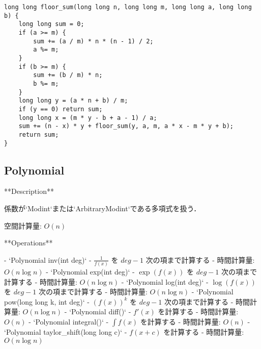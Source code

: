 \begin{lstlisting}
long long floor_sum(long long n, long long m, long long a, long long b) {
    long long sum = 0;
    if (a >= m) {
        sum += (a / m) * n * (n - 1) / 2;
        a %= m;
    }
    if (b >= m) {
        sum += (b / m) * n;
        b %= m;
    }
    long long y = (a * n + b) / m;
    if (y == 0) return sum;
    long long x = (m * y - b + a - 1) / a;
    sum += (n - x) * y + floor_sum(y, a, m, a * x - m * y + b);
    return sum;
}
\end{lstlisting}

\subsection{Polynomial}

\begin{small}
\begin{markdown}
**Description**

係数が`Modint`または`ArbitraryModint`である多項式を扱う．

空間計算量: $O(n)$

**Operations**

- `Polynomial inv(int deg)`
    - $\frac{1}{f(x)}$ を $deg - 1$ 次の項まで計算する
    - 時間計算量: $O(n \log n)$
- `Polynomial exp(int deg)`
    - $\exp(f(x))$ を $deg - 1$ 次の項まで計算する
    - 時間計算量: $O(n \log n)$
- `Polynomial log(int deg)`
    - $\log(f(x))$ を $deg - 1$ 次の項まで計算する
    - 時間計算量: $O(n \log n)$
- `Polynomial pow(long long k, int deg)`
    - $(f(x))^k$ を $deg - 1$ 次の項まで計算する
    - 時間計算量: $O(n \log n)$
- `Polynomial diff()`
    - $f'(x)$ を計算する
    - 時間計算量: $O(n)$
- `Polynomial integral()`
    - $\int f(x)$ を計算する
    - 時間計算量: $O(n)$
- `Polynomial taylor\_shift(long long c)`
    - $f(x+c)$ を計算する
    - 時間計算量: $O(n \log n)$

\end{markdown}
\end{small}

